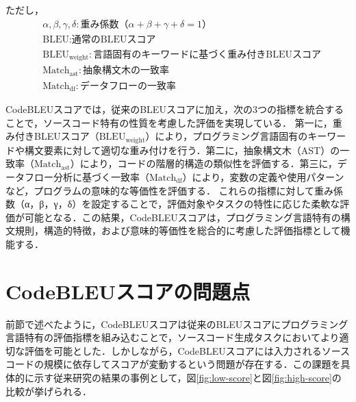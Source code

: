 \documentclass[11pt]{jreport}
\begin{document}
\noindent
ただし，
\begin{align*}
&\alpha, \beta, \gamma, \delta: \text{重み係数（}\alpha + \beta + \gamma + \delta = 1\text{）} \\
&\text{BLEU}: \text{通常のBLEUスコア} \\
&\text{BLEU}_{\text{weight}}: \text{言語固有のキーワードに基づく重み付きBLEUスコア} \\
&\text{Match}_{\text{ast}}: \text{抽象構文木の一致率} \\
&\text{Match}_{\text{df}}: \text{データフローの一致率}
\end{align*}

CodeBLEUスコアでは，従来のBLEUスコアに加え，次の3つの指標を統合することで，ソースコード特有の性質を考慮した評価を実現している．
第一に，重み付きBLEUスコア（$\text{BLEU}_{\text{weight}}$）により，プログラミング言語固有のキーワードや構文要素に対して適切な重み付けを行う．第二に，抽象構文木（AST）の一致率（$\text{Match}_{\text{ast}}$）により，コードの階層的構造の類似性を評価する．第三に，データフロー分析に基づく一致率（$\text{Match}_{\text{df}}$）により，変数の定義や使用パターンなど，プログラムの意味的な等価性を評価する．
これらの指標に対して重み係数（α，β，γ，δ）を設定することで，評価対象やタスクの特性に応じた柔軟な評価が可能となる．この結果，CodeBLEUスコアは，プログラミング言語特有の構文規則，構造的特徴，および意味的等価性を総合的に考慮した評価指標として機能する．


\section {CodeBLEUスコアの問題点}
前節で述べたように，CodeBLEUスコアは従来のBLEUスコアにプログラミング言語特有の評価指標を組み込むことで，ソースコード生成タスクにおいてより適切な評価を可能とした．しかしながら，CodeBLEUスコアには入力されるソースコードの規模に依存してスコアが変動するという問題が存在する．この課題を具体的に示す従来研究の結果の事例として，図\ref{fig:low-score}と図\ref{fig:high-score}の比較が挙げられる．
\end{document}
